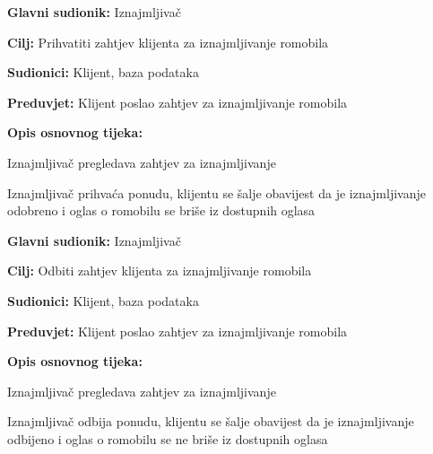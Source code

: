 						\begin{packed_item}
							
							\item \textbf{Glavni sudionik: }Iznajmljivač
							\item  \textbf{Cilj: }Prihvatiti zahtjev klijenta za iznajmljivanje romobila
							\item  \textbf{Sudionici: }Klijent, baza podataka
							\item  \textbf{Preduvjet: }Klijent poslao zahtjev za iznajmljivanje romobila
							\item  \textbf{Opis osnovnog tijeka:}
							
							\item[] \begin{packed_enum}
								
								\item Iznajmljivač pregledava zahtjev za iznajmljivanje 
								\item Iznajmljivač prihvaća ponudu, klijentu se šalje obavijest da je iznajmljivanje odobreno i oglas o romobilu se briše iz dostupnih oglasa    
							\end{packed_enum}
							
							
						\end{packed_item}
						\noindent \underbar{\textbf{UC18 - Odbij ponudu}}
						\begin{packed_item}
							
							\item \textbf{Glavni sudionik: }Iznajmljivač
							\item  \textbf{Cilj: }Odbiti zahtjev klijenta za iznajmljivanje romobila
							\item  \textbf{Sudionici: }Klijent, baza podataka
							\item  \textbf{Preduvjet: }Klijent poslao zahtjev za iznajmljivanje romobila
							\item  \textbf{Opis osnovnog tijeka:}
							
							\item[] \begin{packed_enum}
								
								\item Iznajmljivač pregledava zahtjev za iznajmljivanje 
								\item Iznajmljivač odbija ponudu, klijentu se šalje obavijest da je iznajmljivanje odbijeno i oglas o romobilu se ne briše iz dostupnih oglasa   
							\end{packed_enum}
							
							
						\end{packed_item}
